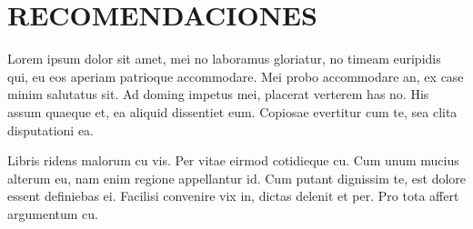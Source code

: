\chapter*{\center \Large RECOMENDACIONES} 

Lorem ipsum dolor sit amet, mei no laboramus gloriatur, no timeam euripidis qui, eu eos aperiam patrioque accommodare. Mei probo accommodare an, ex case minim salutatus sit. Ad doming impetus mei, placerat verterem has no. His assum quaeque et, ea aliquid dissentiet eum. Copiosae evertitur cum te, sea clita disputationi ea.

Libris ridens malorum cu vis. Per vitae eirmod cotidieque cu. Cum unum mucius alterum eu, nam enim regione appellantur id. Cum putant dignissim te, est dolore essent definiebas ei. Facilisi convenire vix in, dictas delenit et per. Pro tota affert argumentum cu.